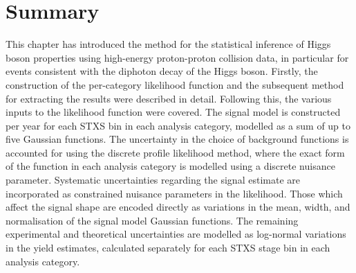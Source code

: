 \section{Summary}
This chapter has introduced the method for the statistical inference of Higgs boson properties using high-energy proton-proton collision data, in particular for events consistent with the diphoton decay of the Higgs boson. Firstly, the construction of the per-category likelihood function and the subsequent method for extracting the results were described in detail. Following this, the various inputs to the likelihood function were covered. The signal model is constructed per year for each STXS bin in each analysis category, modelled as a sum of up to five Gaussian functions. The uncertainty in the choice of background functions is accounted for using the discrete profile likelihood method, where the exact form of the function in each analysis category is modelled using a discrete nuisance parameter. Systematic uncertainties regarding the signal estimate are incorporated as constrained nuisance parameters in the likelihood. Those which affect the signal shape are encoded directly as variations in the mean, width, and normalisation of the signal model Gaussian functions. The remaining experimental and theoretical uncertainties are modelled as log-normal variations in the yield estimates, calculated separately for each STXS stage bin in each analysis category.

